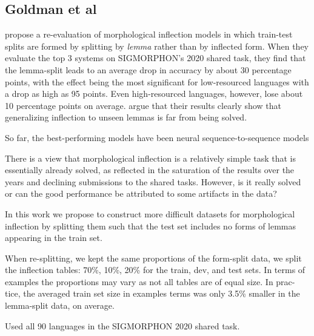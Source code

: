 \documentclass[11pt]{article}
\begin{document}
\subsection{Goldman et al}

\citet{goldman-etal-2022-un} propose a re-evaluation of morphological inflection models in which train-test splits are formed by splitting by \textit{lemma} rather than by inflected form. 
When they evaluate the top 3 systems on SIGMORPHON's 2020 shared task, they find that the lemma-split leads to an average drop in accuracy by about 30 percentage points, with the effect being the most significant for low-resourced languages with a drop as high as 95 points. 
Even high-resourced languages, however, lose about 10 percentage points on average. 
\citeauthor{goldman-etal-2022-un} argue that their results clearly show that generalizing inflection to unseen lemmas is far from being solved. 


So far, the best-performing models have been neural sequence-to-sequence models \citep{kann-schutze-2016-med, canby-etal-2020-university}

There is a view that morphological inflection is a relatively simple task that is essentially already solved, as reflected in the saturation of the results over the years and declining submissions to the shared tasks. 
However, is it really solved or can the good performance be attributed to some artifacts in the data? 




In this work we propose to construct more difficult datasets for morphological inflection by splitting them such that the test set includes no forms of lemmas appearing in the train set. 

When re-splitting, we kept the same proportions of the form-split data, we split the inflection tables: 70\%, 10\%, 20\% for the train, dev, and test sets. 
In terms of examples the proportions may vary as not all tables are of equal size. In prac- tice, the averaged train set size in examples terms was only 3.5\% smaller in the lemma-split data, on average.

Used all 90 languages in the SIGMORPHON 2020 shared task. 
\end{document}
